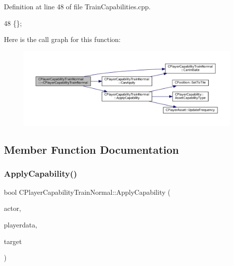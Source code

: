 Definition at line 48 of file Train\+Capabilities.\+cpp.


\begin{DoxyCode}
48 \{\};
\end{DoxyCode}
Here is the call graph for this function\+:
\nopagebreak
\begin{figure}[H]
\begin{center}
\leavevmode
\includegraphics[width=350pt]{classCPlayerCapabilityTrainNormal_a1cc40f48e17f7e7fab3af09a85b4eb0f_cgraph}
\end{center}
\end{figure}


\subsection{Member Function Documentation}
\hypertarget{classCPlayerCapabilityTrainNormal_a04ed166d2072d44ddc96735ac1beb9bc}{}\label{classCPlayerCapabilityTrainNormal_a04ed166d2072d44ddc96735ac1beb9bc} 
\subsubsection{\texorpdfstring{Apply\+Capability()}{ApplyCapability()}}
{\footnotesize\ttfamily bool C\+Player\+Capability\+Train\+Normal\+::\+Apply\+Capability (\begin{DoxyParamCaption}\item[{std\+::shared\+\_\+ptr$<$ \hyperlink{classCPlayerAsset}{C\+Player\+Asset} $>$}]{actor,  }\item[{std\+::shared\+\_\+ptr$<$ \hyperlink{classCPlayerData}{C\+Player\+Data} $>$}]{playerdata,  }\item[{std\+::shared\+\_\+ptr$<$ \hyperlink{classCPlayerAsset}{C\+Player\+Asset} $>$}]{target }\end{DoxyParamCaption})\hspace{0.3cm}{\ttfamily [virtual]}}




